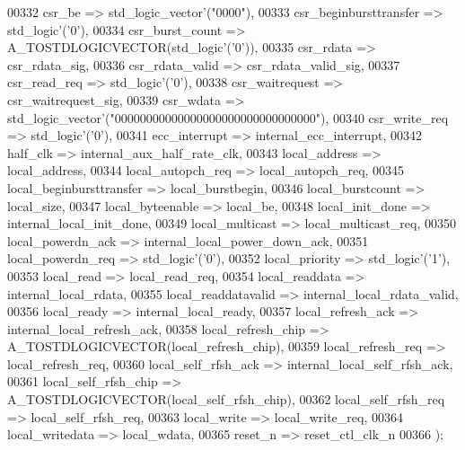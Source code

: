 \begin{DoxyCode}
00332             csr\_be => std\_logic\_vector'\textcolor{vhdlchar}{(}"0000"\textcolor{vhdlchar}{)},
00333             csr\_beginbursttransfer => std\_logic'\textcolor{vhdlchar}{(}'0'\textcolor{vhdlchar}{)},
00334             csr\_burst\_count => A\_TOSTDLOGICVECTOR\textcolor{vhdlchar}{(}std\_logic'\textcolor{vhdlchar}{(}'0'\textcolor{vhdlchar}{)}\textcolor{vhdlchar}{)},
00335             csr\_rdata => csr_rdata_sig,
00336             csr\_rdata\_valid => csr_rdata_valid_sig,
00337             csr\_read\_req => std\_logic'\textcolor{vhdlchar}{(}'0'\textcolor{vhdlchar}{)},
00338             csr\_waitrequest => csr_waitrequest_sig,
00339             csr\_wdata => std\_logic\_vector'\textcolor{vhdlchar}{(}"00000000000000000000000000000000"\textcolor{vhdlchar}{)},
00340             csr\_write\_req => std\_logic'\textcolor{vhdlchar}{(}'0'\textcolor{vhdlchar}{)},
00341             ecc\_interrupt => internal_ecc_interrupt,
00342             half\_clk => internal_aux_half_rate_clk,
00343             local\_address => local_address,
00344             local\_autopch\_req => local_autopch_req,
00345             local\_beginbursttransfer => local_burstbegin,
00346             local\_burstcount => local_size,
00347             local\_byteenable => local_be,
00348             local\_init\_done => internal_local_init_done,
00349             local\_multicast => local_multicast_req,
00350             local\_powerdn\_ack => internal_local_power_down_ack,
00351             local\_powerdn\_req => std\_logic'\textcolor{vhdlchar}{(}'0'\textcolor{vhdlchar}{)},
00352             local\_priority => std\_logic'\textcolor{vhdlchar}{(}'1'\textcolor{vhdlchar}{)},
00353             local\_read => local_read_req,
00354             local\_readdata => internal_local_rdata,
00355             local\_readdatavalid => internal_local_rdata_valid,
00356             local\_ready => internal_local_ready,
00357             local\_refresh\_ack => internal_local_refresh_ack,
00358             local\_refresh\_chip => A\_TOSTDLOGICVECTOR\textcolor{vhdlchar}{(}local_refresh_chip\textcolor{vhdlchar}{)},
00359             local\_refresh\_req => local_refresh_req,
00360             local\_self\_rfsh\_ack => internal_local_self_rfsh_ack,
00361             local\_self\_rfsh\_chip => A\_TOSTDLOGICVECTOR\textcolor{vhdlchar}{(}local_self_rfsh_chip\textcolor{vhdlchar}{)},
00362             local\_self\_rfsh\_req => local_self_rfsh_req,
00363             local\_write => local_write_req,
00364             local\_writedata => local_wdata,
00365             reset\_n => reset_ctl_clk_n
00366     \textcolor{vhdlchar}{)};

\end{DoxyCode}
